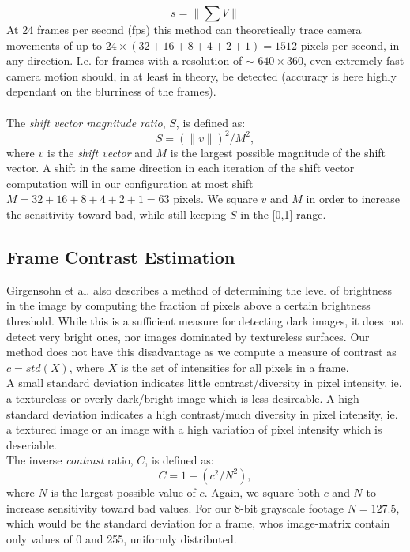 %
\[
s = \|\sum V\|
\]
%
At 24 frames per second (fps) this method can theoretically trace camera movements of up to $24 \times (32+16+8+4+2+1) = 1512$ pixels per second, in any direction. I.e. for frames with a resolution of $\sim$ $640\times360$, even extremely fast camera motion should, in at least in theory, be detected (accuracy is here highly dependant on the blurriness of the frames).\\
\\
The \textit{shift vector magnitude ratio}, $S$, is defined as:
%
\[
S = (\|v\|)^2 / M^2, 
\]
%
where $v$ is the \textit{shift vector} and $M$ is the largest possible magnitude of the shift vector. A shift in the same direction in each iteration of the shift vector computation will in our configuration at most shift $M = 32+16+8+4+2+1=63$ pixels. We square $v$ and $M$ in order to increase the sensitivity toward bad, while still keeping $S$ in the [0,1] range.
%
\subsection{Frame Contrast Estimation}\label{sec:frame_contrast_estimation}
%
Girgensohn et al.\cite{Girgensohn:2000:SAH:354401.354415} also describes a method of determining the level of brightness in the image by computing the fraction of pixels above a certain brightness threshold. While this is a sufficient measure for detecting dark images, it does not detect very bright ones, nor images dominated by textureless surfaces. Our method does not have this disadvantage as we compute a measure of contrast as $c = std(X)$, where $X$ is the set of intensities for all pixels in a frame.\\
A small standard deviation indicates little contrast/diversity in pixel intensity, ie. a textureless or overly dark/bright image which is less desireable.
A high standard deviation indicates a high contrast/much diversity in pixel intensity, ie. a textured image or an image with a high variation of pixel intensity which is deseriable.\\
% 
The inverse \textit{contrast} ratio, $C$, is defined as:
\[
C = 1 - (c^2 / N^2),
\]
where $N$ is the largest possible value of $c$. Again, we square both $c$ and $N$ to increase sensitivity toward bad values. For our 8-bit grayscale footage $N = 127.5$, which would be the standard deviation for a frame, whos image-matrix contain only values of 0 and 255, uniformly distributed.\\
%
